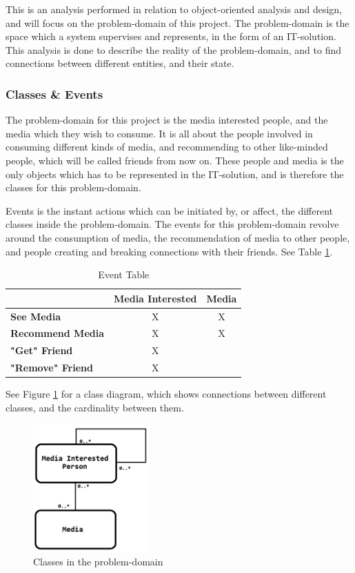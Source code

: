 This is an analysis performed in relation to object-oriented analysis and design, and will focus on the problem-domain of this project. The problem-domain is the space which a system supervises and represents, in the form of an IT-solution. This analysis is done to describe the reality of the problem-domain, and to find connections between different entities, and their state.

\subsubsection{Classes \& Events}

The problem-domain for this project is  the media interested people, and the media which they wish to consume. It is all about the people involved in consuming different kinds of media, and recommending to other like-minded people, which will be called friends from now on. These people and media is the only objects which has to be represented in the IT-solution, and is therefore the classes for this problem-domain.

Events is the instant actions which can be initiated by, or affect, the different classes inside the problem-domain. The events for this problem-domain revolve around the consumption of media, the recommendation of media to other people, and people creating and breaking connections with their friends. See Table \ref{EventTable}.

\begin{table}[htb]
\centering
\begin{tabular}{|l|c|c|} \hline
	  & \textbf{Media Interested} & \textbf{Media} \\ \hline
	\textbf{See Media} & X & X \\ \hline
	\textbf{Recommend Media} & X & X \\ \hline
	\textbf{"Get" Friend} & X &  \\ \hline
	\textbf{"Remove" Friend} & X &  \\ \hline
\end{tabular}
\caption{Event Table}
\label{EventTable}
\end{table}

See Figure \ref{ClassDiagram} for a class diagram, which shows connections between different classes, and the cardinality between them.

\begin{figure}[htb]
\centering
\includegraphics[width=0.4\textwidth]{Images/classdiagram.png}
\caption{Classes in the problem-domain}
\label{ClassDiagram}
\end{figure}

